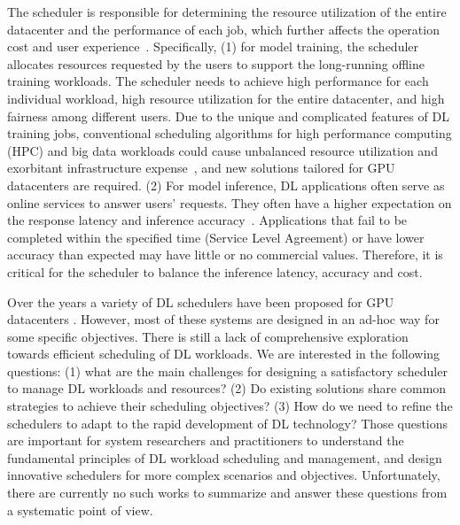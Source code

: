 The scheduler is responsible for determining the resource utilization of the entire datacenter and the performance of each job, which further affects the operation cost and user experience~\cite{Chronus}. Specifically, (1) for model training, the scheduler allocates resources requested by the users to support the long-running offline training workloads. The scheduler needs to achieve high performance for each individual workload, high resource utilization for the entire datacenter, and high fairness among different users. Due to the unique and complicated features of DL training jobs, conventional scheduling algorithms for high performance computing (HPC) and big data workloads could cause unbalanced resource utilization and exorbitant infrastructure expense~\cite{ASTRAEA}, and new solutions tailored for GPU datacenters are required. (2) For model inference, DL applications often serve as online services to answer users' requests. They often have a higher expectation on the response latency and inference accuracy~\cite{Daniel2017clipper,zhang2019mark}. Applications that fail to be completed within the specified time (Service Level Agreement) or have lower accuracy than expected may have little or no commercial values. Therefore, it is critical for the scheduler to balance the inference latency, accuracy and cost.



Over the years a variety of DL schedulers have been proposed for GPU datacenters \cite{Gandiva, Pollux, Gavel, Tiresias, Daniel2017clipper, zhang2019mark, INFaaS}. However, most of these systems are designed in an ad-hoc way for some specific objectives. There is still a lack of comprehensive exploration towards efficient scheduling of DL workloads. We are interested in the following questions: (1) what are the main challenges for designing a satisfactory scheduler to manage DL workloads and resources? (2) Do existing solutions share common strategies to achieve their scheduling objectives? (3) How do we need to refine the schedulers to adapt to the rapid development of DL technology? Those questions are important for system researchers and practitioners to understand the fundamental principles of DL workload scheduling and management, and design innovative schedulers for more complex scenarios and objectives. Unfortunately, there are currently no such works to summarize and answer these questions from a systematic point of view.


